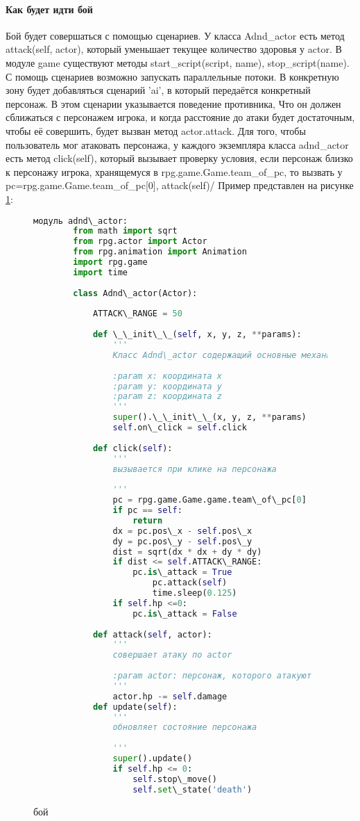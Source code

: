 \paragraph{Как будет идти бой}
Бой будет совершаться с помощью сценариев. У класса Adnd\_actor есть метод attack(self, actor), который уменьшает текущее количество здоровья у actor. В модуле game существуют методы start\_script(script, name), stop\_script(name). С помощь сценариев возможно запускать параллельные потоки. В конкретную зону будет добавляться сценарий 'ai', в который передаётся конкретный персонаж. В этом сценарии указывается поведение противника, Что он должен сближаться с персонажем игрока, и когда расстояние до атаки будет достаточным, чтобы её совершить, будет вызван метод actor.attack. Для того, чтобы пользователь мог атаковать персонажа, у каждого экземпляра класса adnd\_actor есть метод click(self), который вызывает проверку условия, если персонаж близко к персонажу игрока, хранящемуся в rpg.game.Game.team\_of\_pc, то вызвать у pc=rpg.game.Game.team\_of\_pc[0], attack(self)/
Пример представлен на рисунке \ref{battle:image}:
\begin{figure}[H]
	\begin{lstlisting}[language=Python]
		модуль adnd\_actor:
		from math import sqrt
		from rpg.actor import Actor
		from rpg.animation import Animation
		import rpg.game
		import time
		
		class Adnd\_actor(Actor):
		
			ATTACK\_RANGE = 50
		
			def \_\_init\_\_(self, x, y, z, **params):
				'''
				Класс Adnd\_actor содержащий основные механики взаимодействия с другими персонажами
		
				:param x: координата x
				:param y: координата y
				:param z: координата z
				'''
				super().\_\_init\_\_(x, y, z, **params)
				self.on\_click = self.click
		
			def click(self):
				'''
				вызывается при клике на персонажа
		
				'''
				pc = rpg.game.Game.game.team\_of\_pc[0]
				if pc == self:
					return
				dx = pc.pos\_x - self.pos\_x
				dy = pc.pos\_y - self.pos\_y
				dist = sqrt(dx * dx + dy * dy)
				if dist <= self.ATTACK\_RANGE:
					pc.is\_attack = True
						pc.attack(self)
						time.sleep(0.125)
				if self.hp <=0:
					pc.is\_attack = False
		
			def attack(self, actor):
				'''
				совершает атаку по actor
		
				:param actor: персонаж, которого атакуют
				'''
				actor.hp -= self.damage
			def update(self):
				'''
				обновляет состояние персонажа
		
				'''
				super().update()
				if self.hp <= 0:
					self.stop\_move()
					self.set\_state('death')
\end{lstlisting}  
\caption{бой}
\label{battle:image}
\end{figure}
